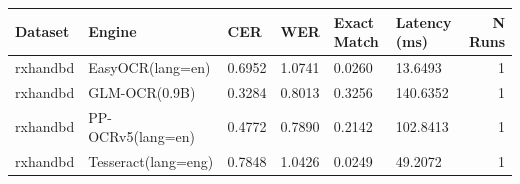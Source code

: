 \begin{tabular}{llllllr}
\toprule
Dataset & Engine & CER & WER & Exact Match & Latency (ms) & N Runs \\
\midrule
rxhandbd & EasyOCR(lang=en) & 0.6952 & 1.0741 & 0.0260 & 13.6493 & 1 \\
rxhandbd & GLM-OCR(0.9B) & 0.3284 & 0.8013 & 0.3256 & 140.6352 & 1 \\
rxhandbd & PP-OCRv5(lang=en) & 0.4772 & 0.7890 & 0.2142 & 102.8413 & 1 \\
rxhandbd & Tesseract(lang=eng) & 0.7848 & 1.0426 & 0.0249 & 49.2072 & 1 \\
\bottomrule
\end{tabular}
